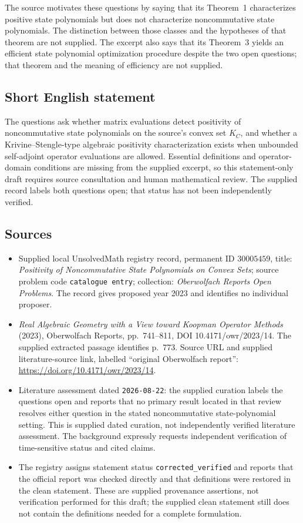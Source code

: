 \documentclass[11pt]{article}
\begin{document}
The source motivates these questions by saying that its Theorem~1 characterizes positive state polynomials but does not characterize noncommutative state polynomials. The distinction between those classes and the hypotheses of that theorem are not supplied. The excerpt also says that its Theorem~3 yields an efficient state polynomial optimization procedure despite the two open questions; that theorem and the meaning of efficiency are not supplied.
\subsection{Short English statement}
The questions ask whether matrix evaluations detect positivity of noncommutative state polynomials on the source's convex set \(K_C\), and whether a Krivine--Stengle-type algebraic positivity characterization exists when unbounded self-adjoint operator evaluations are allowed. Essential definitions and operator-domain conditions are missing from the supplied excerpt, so this statement-only draft requires source consultation and human mathematical review. The supplied record labels both questions open; that status has not been independently verified.
\subsection{Sources}
\begin{itemize}
\item Supplied local UnsolvedMath registry record, permanent ID \(30005459\), title: \emph{Positivity of Noncommutative State Polynomials on Convex Sets}; source problem code \texttt{catalogue entry}; collection: \emph{Oberwolfach Reports Open Problems}. The record gives proposed year 2023 and identifies no individual proposer.
\item \emph{Real Algebraic Geometry with a View toward Koopman Operator Methods} (2023), Oberwolfach Reports, pp.~741--811, DOI 10.4171/owr/2023/14. The supplied extracted passage identifies p.~773. Source URL and supplied literature-source link, labelled ``original Oberwolfach report'': \url{https://doi.org/10.4171/owr/2023/14}.
\item Literature assessment dated \texttt{2026-08-22}: the supplied curation labels the questions open and reports that no primary result located in that review resolves either question in the stated noncommutative state-polynomial setting. This is supplied dated curation, not independently verified literature assessment. The background expressly requests independent verification of time-sensitive status and cited claims.
\item The registry assigns statement status \texttt{corrected\_verified} and reports that the official report was checked directly and that definitions were restored in the clean statement. These are supplied provenance assertions, not verification performed for this draft; the supplied clean statement still does not contain the definitions needed for a complete formulation.
\end{itemize}
\end{document}
